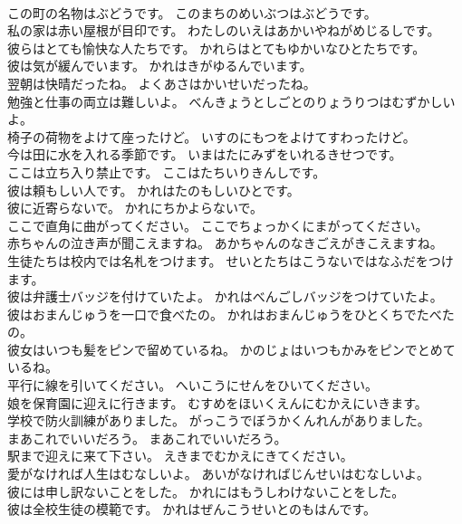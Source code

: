 \documentclass[8pt]{extreport}
\begin{document}
\begin{CJK}{UTF8}{min}
\\	この町の名物はぶどうです。	このまちのめいぶつはぶどうです。 
\\	私の家は赤い屋根が目印です。	わたしのいえはあかいやねがめじるしです。 
\\	彼らはとても愉快な人たちです。	かれらはとてもゆかいなひとたちです。 
\\	彼は気が緩んでいます。	かれはきがゆるんでいます。 
\\	翌朝は快晴だったね。	よくあさはかいせいだったね。 
\\	勉強と仕事の両立は難しいよ。	べんきょうとしごとのりょうりつはむずかしいよ。 
\\	椅子の荷物をよけて座ったけど。	いすのにもつをよけてすわったけど。 
\\	今は田に水を入れる季節です。	いまはたにみずをいれるきせつです。 
\\	ここは立ち入り禁止です。	ここはたちいりきんしです。 
\\	彼は頼もしい人です。	かれはたのもしいひとです。 
\\	彼に近寄らないで。	かれにちかよらないで。 
\\	ここで直角に曲がってください。	ここでちょっかくにまがってください。 
\\	赤ちゃんの泣き声が聞こえますね。	あかちゃんのなきごえがきこえますね。 
\\	生徒たちは校内では名札をつけます。	せいとたちはこうないではなふだをつけます。 
\\	彼は弁護士バッジを付けていたよ。	かれはべんごしバッジをつけていたよ。 
\\	彼はおまんじゅうを一口で食べたの。	かれはおまんじゅうをひとくちでたべたの。 
\\	彼女はいつも髪をピンで留めているね。	かのじょはいつもかみをピンでとめているね。 
\\	平行に線を引いてください。	へいこうにせんをひいてください。 
\\	娘を保育園に迎えに行きます。	むすめをほいくえんにむかえにいきます。 
\\	学校で防火訓練がありました。	がっこうでぼうかくんれんがありました。 
\\	まあこれでいいだろう。	まあこれでいいだろう。 
\\	駅まで迎えに来て下さい。	えきまでむかえにきてください。 
\\	愛がなければ人生はむなしいよ。	あいがなければじんせいはむなしいよ。 
\\	彼には申し訳ないことをした。	かれにはもうしわけないことをした。 
\\	彼は全校生徒の模範です。	かれはぜんこうせいとのもはんです。 

\end{CJK}
\end{document}
